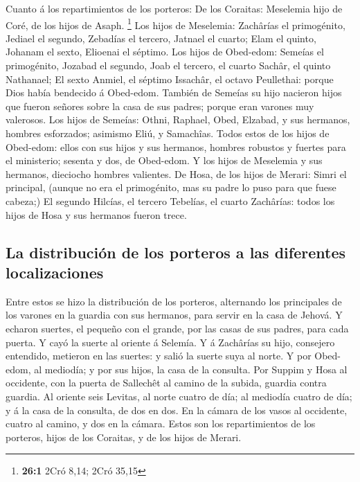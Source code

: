  Cuanto á los repartimientos de los porteros: De los
Coraitas: Meselemia hijo de Coré, de los hijos de Asaph. \footnote{\textbf{26:1}
  2Cró 8,14; 2Cró 35,15}  Los hijos de Meselemia: Zachârías
el primogénito, Jediael el segundo, Zebadías el tercero, Jatnael el
cuarto;  Elam el quinto, Johanam el sexto, Elioenai el
séptimo.  Los hijos de Obed-edom: Semeías el primogénito,
Jozabad el segundo, Joab el tercero, el cuarto Sachâr, el quinto
Nathanael;  El sexto Anmiel, el séptimo Issachâr, el octavo
Peullethai: porque Dios había bendecido á Obed-edom. 
También de Semeías su hijo nacieron hijos que fueron señores sobre la
casa de sus padres; porque eran varones muy valerosos.  Los
hijos de Semeías: Othni, Raphael, Obed, Elzabad, y sus hermanos, hombres
esforzados; asimismo Eliú, y Samachîas.  Todos estos de los
hijos de Obed-edom: ellos con sus hijos y sus hermanos, hombres robustos
y fuertes para el ministerio; sesenta y dos, de Obed-edom. 
Y los hijos de Meselemia y sus hermanos, dieciocho hombres valientes.
 De Hosa, de los hijos de Merari: Simri el principal,
(aunque no era el primogénito, mas su padre lo puso para que fuese
cabeza;)  El segundo Hilcías, el tercero Tebelías, el
cuarto Zachârías: todos los hijos de Hosa y sus hermanos fueron trece.

\hypertarget{la-distribuciuxf3n-de-los-porteros-a-las-diferentes-localizaciones}{%
\subsection{La distribución de los porteros a las diferentes
localizaciones}\label{la-distribuciuxf3n-de-los-porteros-a-las-diferentes-localizaciones}}

 Entre estos se hizo la distribución de los porteros,
alternando los principales de los varones en la guardia con sus
hermanos, para servir en la casa de Jehová.  Y echaron
suertes, el pequeño con el grande, por las casas de sus padres, para
cada puerta.  Y cayó la suerte al oriente á Selemía. Y á
Zachârías su hijo, consejero entendido, metieron en las suertes: y salió
la suerte suya al norte.  Y por Obed-edom, al mediodía; y
por sus hijos, la casa de la consulta.  Por Suppim y Hosa
al occidente, con la puerta de Sallechêt al camino de la subida, guardia
contra guardia.  Al oriente seis Levitas, al norte cuatro
de día; al mediodía cuatro de día; y á la casa de la consulta, de dos en
dos.  En la cámara de los vasos al occidente, cuatro al
camino, y dos en la cámara.  Estos son los repartimientos
de los porteros, hijos de los Coraitas, y de los hijos de Merari.

